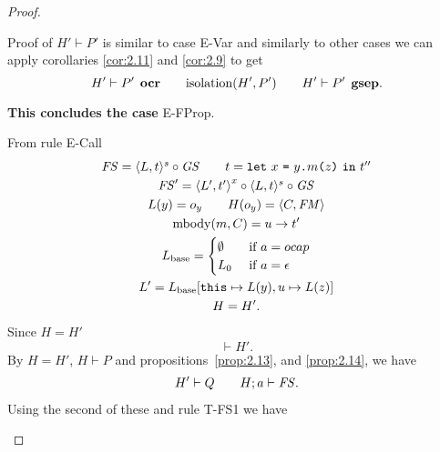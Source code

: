 \begin{proof}
\begin{description}
\begin{description}
\begin{description}
              Proof of $H' \vdash P'$ is similar to case {\sc E-Var} and
              similarly to other cases we can apply corollaries \ref{cor:2.11}
              and \ref{cor:2.9} to get
              \begin{equation}
                H' \vdash P' \:\: \mbox{\bf ocr} \quad\quad \mbox{$\mathrm{isolation}$}(H', P') \quad\quad H'
                \vdash P' \:\: \mbox{\bf gsep}.
              \end{equation}

              {\bf This concludes the case} {\sc E-FProp}.
          \end{description}

        \item[Case {\sc E-Call}:] From rule {\sc E-Call}
          \begin{equation} \label{eq:ecall1}
            \begin{gathered}
              \mathit{FS} = \mbox{$\langle L, t \rangle^s$} \circ \mathit{GS} \quad\quad t = \mbox{\mdseries\texttt{let}~$x$~\texttt{=}~$\mbox{\mdseries$y$\texttt{.}$m$\texttt{(}$z$\texttt{)}}$~\texttt{in}~$t''$}\\
              \mathit{FS}' = \mbox{$\langle L', t' \rangle$}^x \circ \mbox{$\langle L, t \rangle^s$} \circ \mathit{GS} \\
              L(y) = o_y \quad\quad H(o_y) = \mbox{$\langle C, \mathit{FM} \rangle$} \\
              \mbox{$\mathrm{mbody}$}(m, C) = u \to t' \\
              L_{\text{base}} =
              \begin{cases}
                \emptyset & \text{ if } a = \mbox{$ocap$} \\
                L_0       & \text{ if } a = \mbox{$\epsilon$}
              \end{cases} \\
              L' = L_{\text{base}}[\mbox{\mdseries\texttt{this}} \mapsto L(y), u \mapsto L(z)] \\
              H = H'.
            \end{gathered}
          \end{equation}
          Since $H = H'$ 
          \begin{equation*}
            \vdash H'.
          \end{equation*}
          By $H = H'$, $H \vdash P$ and propositions~\ref{prop:2.13},
          and \ref{prop:2.14},  we have
          \begin{equation}
            \begin{gathered}
              H' \vdash Q \quad\quad H;a \vdash \mathit{FS}.
            \end{gathered}
          \end{equation}
          Using the second of these and rule {\sc T-FS1} we have

\end{description}
\end{description}
\end{proof}
